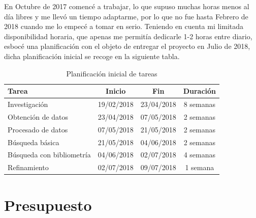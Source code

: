 En Octubre de 2017 comencé a trabajar, lo que supuso muchas horas menos al día libres y me llevó un tiempo adaptarme, por lo que no fue hasta Febrero de 2018 cuando me lo empecé a tomar en serio. Teniendo en cuenta mi limitada disponibilidad horaria, que apenas me permitía dedicarle 1-2 horas entre diario, esbocé una planificación con el objeto de entregar el proyecto en Julio de 2018, dicha planificación inicial se recoge en la siguiente tabla.

\begin{table} [h!]
	\centering
	\begin{tabular}{l c c c}
		\hline
		\textbf{Tarea}            & \textbf{Inicio} & \textbf{Fin} & \textbf{Duración} \\ \hline\hline
		Investigación             & 19/02/2018      & 23/04/2018   & 8 semanas         \\ \hline
		Obtención de datos        & 23/04/2018      & 07/05/2018   & 2 semanas         \\ \hline
		Procesado de datos        & 07/05/2018      & 21/05/2018   & 2 semanas         \\ \hline
		Búsqueda básica           & 21/05/2018      & 04/06/2018   & 2 semanas         \\ \hline
		Búsqueda con bibliometría & 04/06/2018      & 02/07/2018   & 4 semanas         \\ \hline
		Refinamiento              & 02/07/2018      & 09/07/2018   & 1 semana          \\ \hline
	\end{tabular}
	\caption{Planificación inicial de tareas}
\end{table}

\section{Presupuesto}